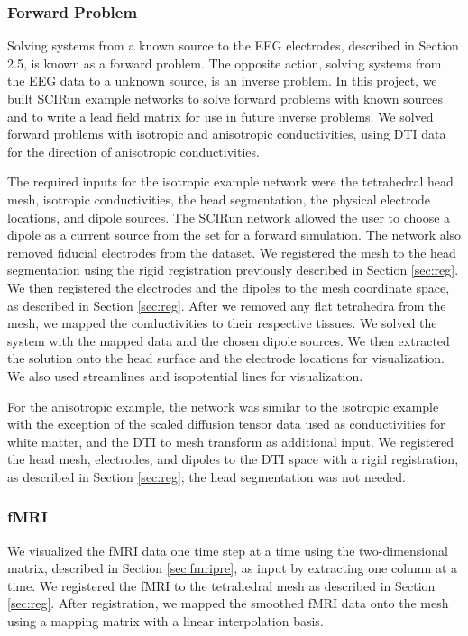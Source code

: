 \subsubsection{Forward Problem}

Solving systems from a known source to the EEG electrodes, described in Section 2.5, is known as a forward problem. The opposite action, solving systems from the EEG data to a unknown source, is an inverse problem.  In this project, we built SCIRun example networks to solve forward problems with known sources and to write a lead field matrix for use in future inverse problems. We solved forward problems with isotropic and anisotropic conductivities, using DTI data for the direction of anisotropic conductivities.

The required inputs for the isotropic example network were the tetrahedral head mesh, isotropic conductivities, the head segmentation, the physical electrode locations, and dipole sources. The SCIRun network allowed the user to choose a dipole as a current source from the set for a forward simulation. The network also removed fiducial electrodes from the dataset. We registered the mesh to the head segmentation using the rigid registration previously described in Section \ref{sec:reg}. We then registered the electrodes and the dipoles to the mesh coordinate space, as described in Section \ref{sec:reg}. After we removed any flat tetrahedra from the mesh, we mapped the conductivities to their respective tissues. We solved the system with the mapped data and the chosen dipole sources. We then extracted the solution onto the head surface and the electrode locations for visualization. We also used streamlines and isopotential lines for visualization.

For the anisotropic example, the network was similar to the isotropic example with the exception of the scaled diffusion tensor data used as conductivities for white matter, and the DTI to mesh transform as additional input. We registered the head mesh, electrodes, and dipoles to the DTI space with a rigid registration, as described in Section \ref{sec:reg}; the head segmentation was not needed.

\subsubsection{fMRI}

We visualized the fMRI data one time step at a time using the two-dimensional matrix, described in Section \ref{sec:fmripre}, as input by extracting one column at a time. We registered the fMRI to the tetrahedral mesh as described in Section \ref{sec:reg}. After registration, we mapped the smoothed fMRI data onto the mesh using a mapping matrix with a linear interpolation basis.

